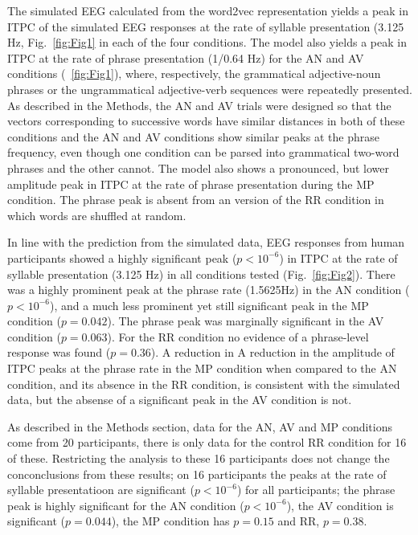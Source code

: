 \documentclass[10pt,letterpaper]{article}
\begin{document}
The simulated EEG calculated from the word2vec representation yields a
peak in ITPC of the simulated EEG responses at the rate of syllable
presentation (3.125 Hz, Fig.~\ref{fig:Fig1} in each of the four
conditions. The model also yields a peak in ITPC at the rate of phrase
presentation (1/0.64 Hz) for the AN and AV conditions
(~\ref{fig:Fig1}), where, respectively, the grammatical adjective-noun
phrases or the ungrammatical adjective-verb sequences were repeatedly
presented. As described in the Methods, the AN and AV trials were
designed so that the vectors corresponding to successive words have
similar distances in both of these conditions and the AN and AV
conditions show similar peaks at the phrase frequency, even though one
condition can be parsed into grammatical two-word phrases and the
other cannot. The model also shows a pronounced, but lower amplitude
peak in ITPC at the rate of phrase presentation during the MP
condition. The phrase peak is absent from an version of the RR condition in which
words are shuffled at random.

In line with the prediction from the simulated data, EEG responses
from human participants showed a highly significant peak ($p<10^{-6}$)
in ITPC at the rate of syllable presentation (3.125 Hz) in all
conditions tested (Fig.~\ref{fig:Fig2}). There was a highly prominent
peak at the phrase rate (1.5625Hz) in the AN condition ($p<10^{-6}$),
and a much less prominent yet still significant peak in the MP
condition ($p=0.042$). The phrase peak was marginally significant in
the AV condition ($p=0.063$). For the RR condition no evidence of a
phrase-level response was found ($p=0.36$). A reduction in A reduction
in the amplitude of ITPC peaks at the phrase rate in the MP condition
when compared to the AN condition, and its absence in the RR
condition, is consistent with the simulated data, but the absense of a
significant peak in the AV condition is not.

As described in the Methods section, data for the AN, AV and MP
conditions come from 20 participants, there is only data for the
control RR condition for 16 of these. Restricting the analysis to
these 16 participants does not change the conconclusions from these
results; on 16 participants the peaks at the rate of syllable
presentatioon are significant ($p<10^{-6}$) for all participants; the
phrase peak is highly significant for the AN condition ($p<10^{-6}$),
the AV condition is significant ($p=0.044$), the MP condition has
$p=0.15$ and RR, $p=0.38$.
\end{document}
